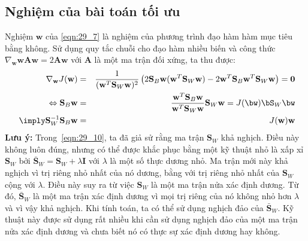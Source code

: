  
 
\subsection{Nghiệm của bài toán tối ưu}
Nghiệm $\mathbf{w}$ của \eqref{eqn:29_7} là nghiệm của phương trình đạo hàm
hàm mục tiêu bằng không. Sử dụng quy tắc chuỗi cho đạo hàm  nhiều biến và công
thức $\nabla_{\mathbf{w}}\mathbf{w} \mathbf{A}\mathbf{w} = 2\mathbf{Aw}$ với
$\mathbf{A}$ là một ma trận đối xứng, ta thu được: 
\begin{eqnarray} 
    \label{eqn:29_8}
    \nabla_{\mathbf{w}} J(\mathbf{w}) &=& \frac{1}{(\mathbf{w}^T\mathbf{S}_{W}\mathbf{w})^2} \left( 
    2\mathbf{S}_B \mathbf{w} (\mathbf{w}^T\mathbf{S}_{W}\mathbf{w}) - 2\mathbf{w}^T\mathbf{S}_{B}\mathbf{w}^T\mathbf{S}_W \mathbf{w} 
    \right) = \mathbf{0}\\\ 
    \label{eqn:29_9}
    \Leftrightarrow \mathbf{S}_B\mathbf{w} &=& \frac{\mathbf{w}^T\mathbf{S}_B
    \mathbf{w}}{\mathbf{w}^T\mathbf{S}_W\mathbf{w}}\mathbf{S}_W\mathbf{w} =
    J(\bw)\bS_W\bw\\\
    \label{eqn:29_10}
    \imply \mathbf{S}_W^{-1}\mathbf{S}_B \mathbf{w} &=& J(\mathbf{w})\mathbf{w}
\end{eqnarray} 
\textbf{Lưu ý:} Trong~\eqref{eqn:29_10}, ta đã giả sử rằng ma trận
$\mathbf{S}_W$ khả nghịch. Điều này không luôn đúng, nhưng có thể được khắc phục bằng một kỹ
thuật nhỏ là xấp xỉ $\mathbf{S}_W$ bởi $ \bar{\mathbf{S}}_W =
\mathbf{S}_W + \lambda\mathbf{I}$ với $\lambda$ là một số thực dương nhỏ. Ma
trận mới này khả nghịch vì trị riêng nhỏ nhất của nó dương, bằng với trị riêng nhỏ
nhất của $\mathbf{S}_W$ cộng với $\lambda$. Điều
này suy ra từ việc $\mathbf{S}_W$ là một ma trận nửa xác định dương. Từ đó,
$\bar{\mathbf{S}}_W$ là một ma trận xác định dương vì mọi trị riêng của nó không nhỏ hơn $\lambda$ và vì vậy khả nghịch. Khi tính toán, ta có thể sử
dụng nghịch đảo của $\bar{\mathbf{S}}_W$. Kỹ thuật này được sử dụng rất nhiều
khi cần sử dụng nghịch đảo của một ma trận nửa xác định dương và chưa biết nó có
thực sự xác định dương hay không.
 
